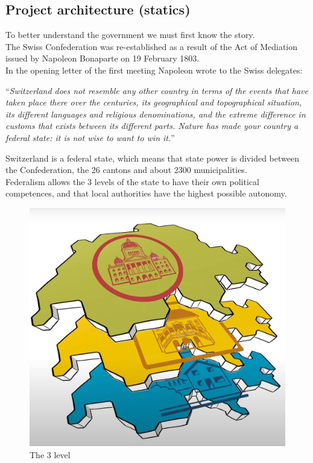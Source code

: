\subsection[Project architecture]{Project architecture (statics)}
To better understand the government we must first know the story.\\
The Swiss Confederation was re-established as a result of the Act of Mediation issued by Napoleon Bonaparte on 19 February 1803.\\
In the opening letter of the first meeting Napoleon wrote to the Swiss delegates:

\epigraph{“\textit{Switzerland does not resemble any other country in terms of the events that have taken place there over the centuries, its geographical and topographical situation, its different languages and religious denominations, and the extreme difference in customs that exists between its different parts. Nature has made your country a federal state: it is not wise to want to win it.}”}{}

Switzerland is a federal state, which means that state power is divided between the Confederation, the 26 cantons and about 2300 municipalities.  \\
Federalism allows the 3 levels of the state to have their own political competences, and that local authorities have the highest possible autonomy.\\

\begin{figure}[H]
\centering
\includegraphics[scale=0.25]{images/trepoteri.jpg}
\caption{The 3 level}
\label{fig:file_3pow}
\end{figure}

